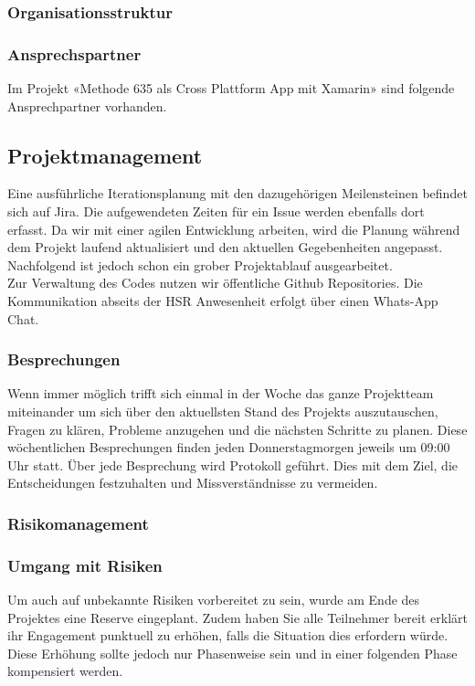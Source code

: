 \subsubsection{Organisationsstruktur}

\subsubsection{Ansprechspartner}
Im Projekt «Methode 635 als Cross Plattform App mit Xamarin» sind folgende Ansprechpartner vorhanden.

\subsection{Projektmanagement}
Eine ausführliche Iterationsplanung mit den dazugehörigen Meilensteinen befindet sich auf Jira. Die aufgewendeten Zeiten für ein Issue werden ebenfalls dort erfasst. 
Da wir mit einer agilen Entwicklung arbeiten, wird die Planung während dem Projekt laufend aktualisiert und den aktuellen Gegebenheiten angepasst. 
Nachfolgend ist jedoch schon ein grober Projektablauf ausgearbeitet. \\
Zur Verwaltung des Codes nutzen wir öffentliche Github Repositories. Die Kommunikation abseits der HSR Anwesenheit erfolgt über einen Whats-App Chat.


\subsubsection{Besprechungen}
Wenn immer möglich trifft sich einmal in der Woche das ganze Projektteam miteinander um sich über den aktuellsten Stand des Projekts auszutauschen, Fragen zu klären, Probleme anzugehen und die nächsten Schritte zu planen. 
Diese wöchentlichen Besprechungen finden jeden Donnerstagmorgen jeweils um 09:00 Uhr statt.
Über jede Besprechung wird Protokoll geführt. Dies mit
dem Ziel, die Entscheidungen festzuhalten und Missverständnisse zu vermeiden.

\subsubsection{Risikomanagement}

\subsubsection{Umgang mit Risiken}
Um auch auf unbekannte Risiken vorbereitet zu sein, wurde am Ende des Projektes eine Reserve eingeplant. Zudem haben Sie alle Teilnehmer bereit erklärt ihr Engagement punktuell zu erhöhen, falls die Situation dies erfordern würde. Diese Erhöhung sollte jedoch nur Phasenweise sein und in einer folgenden Phase kompensiert werden.

